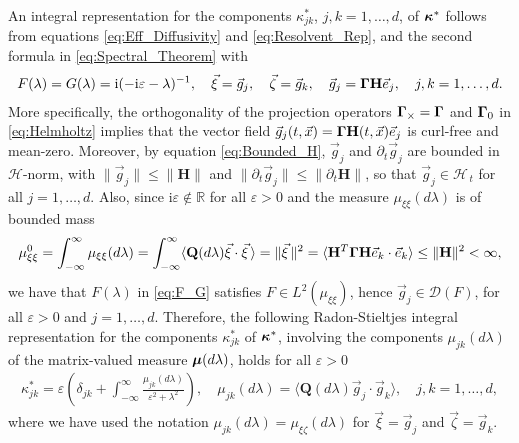 \documentclass[11pt]{amsart}
\newcommand{\I}{\mathrm{i}}
\newcommand{\Hb}{\mathbf{H}}
\newcommand{\Qb}{\mathbf{Q}}
\newcommand{\Hs}{\mathscr{H}}
\newcommand\bmu{\mbox{\boldmath${\mu}$}}
\newcommand\bkappa{\mbox{\boldmath${\kappa}$}}
\newcommand\bGamma{\mbox{\boldmath${\Gamma}$}}
\begin{document}
An integral representation for the components $\kappa^*_{jk}$, $j,k=1,\ldots,d$,
of $\bkappa^*$ follows from equations \eqref{eq:Eff_Diffusivity} and
\eqref{eq:Resolvent_Rep}, and the second formula in
\eqref{eq:Spectral_Theorem} with 
%
\begin{align}\label{eq:F_G}
  F(\lambda)=G(\lambda)=\I(-\I\varepsilon-\lambda)^{-1}, \quad
  \vec{\xi}=\vec{g}_j, \quad
  \vec{\zeta}=\vec{g}_k, \quad
  \vec{g}_j=\bGamma\Hb\vec{e}_j,
  \quad  j,k=1,\ldots,d.
\end{align}
%
More specifically, the orthogonality of the projection operators
$\bGamma_\times=\bGamma$ and $\bGamma_0$ in \eqref{eq:Helmholtz} implies
that the vector field
$\vec{g}_j(t,\vec{x})=\bGamma\Hb(t,\vec{x})\vec{e}_j$ is curl-free and
mean-zero. Moreover, by equation \eqref{eq:Bounded_H}, $\vec{g}_j$
and $\partial_t\vec{g}_j$ are bounded in $\Hs$-norm, with $\|\vec{g}_j\|\leq\|\Hb\|$
and $\|\partial_t\vec{g}_j\|\leq\|\partial_t\Hb\|$, so that
$\vec{g}_j\in\Hs_{\,t}$ for all $j=1,\ldots,d$. Also, since
$\I\varepsilon\not\in\mathbb{R}$ for all $\varepsilon>0$ and the measure $\mu_{\xi\xi}(d\lambda)$
is of bounded mass \cite{Stone:64} 
%
\begin{align}\label{eq:Mass}
  \mu^0_{\xi\xi}=\int_{-\infty}^\infty\mu_{\xi\xi}(d\lambda)
        =\int_{-\infty}^\infty\langle\Qb(d\lambda)\vec{\xi}\cdot\vec{\xi}\,\rangle   
       =\|\vec{\xi}\,\|^2
       =\langle\Hb^T\bGamma\Hb\vec{e}_k\cdot\vec{e}_k\rangle
       \leq\|\Hb\|^2<\infty,
\end{align}
%
we have that $F(\lambda)$ in \eqref{eq:F_G} satisfies $F\in L^2(\mu_{\xi\xi})$, hence 
$\vec{g}_j\in\mathscr{D}(F)$, for all $\varepsilon>0$ and $j=1,\ldots,d$. Therefore, the 
following Radon-Stieltjes integral representation for the components
$\kappa^*_{jk}$ of $\bkappa^*$, involving the components $\mu_{jk}(d\lambda)$ of
the matrix-valued measure $\bmu(d\lambda)$, holds for all $\varepsilon>0$
%
\begin{align}\label{eq:Integral_Rep_kappa*}
  \kappa^*_{jk}=\varepsilon\left(\delta_{jk}+\int_{-\infty}^\infty\frac{\mu_{jk}(d\lambda)}{\varepsilon^2+\lambda^2}\right), \quad
         \mu_{jk}(d\lambda)=\langle\Qb(d\lambda)\vec{g}_j\cdot\vec{g}_k\rangle,
  \quad  j,k=1,\ldots,d,
\end{align}
%
where we have used the notation $\mu_{jk}(d\lambda)=\mu_{\xi\zeta}(d\lambda)$ for
$\vec{\xi}=\vec{g}_j$ and $\vec{\zeta}=\vec{g}_k$.
\end{document}
